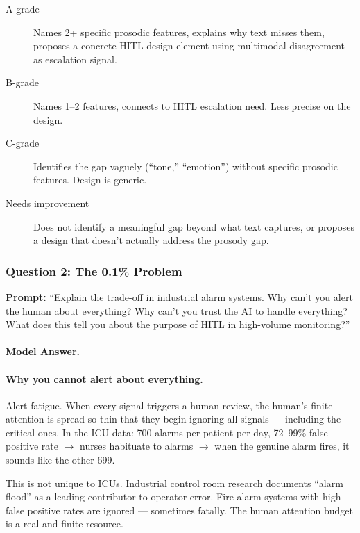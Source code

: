 \begin{description}
    \item[A-grade] Names 2+ specific prosodic features, explains why text misses them, proposes a concrete HITL design element using multimodal disagreement as escalation signal.

    \item[B-grade] Names 1--2 features, connects to HITL escalation need. Less precise on the design.

    \item[C-grade] Identifies the gap vaguely (``tone,'' ``emotion'') without specific prosodic features. Design is generic.

    \item[Needs improvement] Does not identify a meaningful gap beyond what text captures, or proposes a design that doesn't actually address the prosody gap.
\end{description}

\subsubsection{Question 2: The 0.1\% Problem}

\textbf{Prompt:} ``Explain the trade-off in industrial alarm systems. Why can't you alert the human about everything? Why can't you trust the AI to handle everything? What does this tell you about the purpose of HITL in high-volume monitoring?''

\paragraph{Model Answer.}

\paragraph{Why you cannot alert about everything.}

Alert fatigue. When every signal triggers a human review, the human's finite attention is spread so thin that they begin ignoring all signals --- including the critical ones. In the ICU data: 700 alarms per patient per day, 72--99\% false positive rate $\to$ nurses habituate to alarms $\to$ when the genuine alarm fires, it sounds like the other 699.

This is not unique to ICUs. Industrial control room research documents ``alarm flood'' as a leading contributor to operator error. Fire alarm systems with high false positive rates are ignored --- sometimes fatally. The human attention budget is a real and finite resource.

